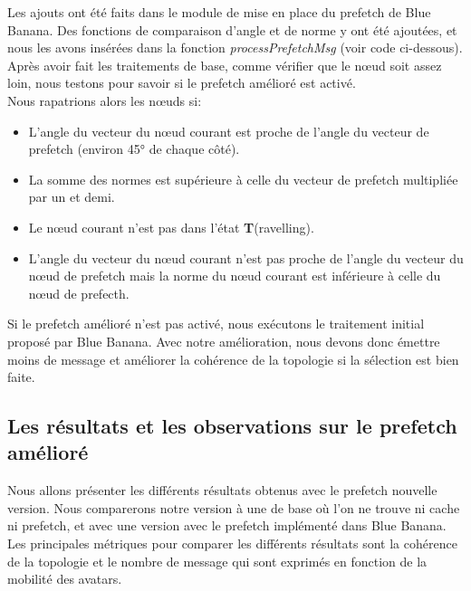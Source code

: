 \par Les ajouts ont été faits dans le module de mise en place du prefetch de Blue Banana. Des fonctions de comparaison d'angle et de norme y ont été ajoutées, et nous les avons insérées dans la fonction \textit{processPrefetchMsg} (voir code ci-dessous). Après avoir fait les traitements de base, comme vérifier que le nœud soit assez loin, nous testons pour savoir si le prefetch amélioré est activé. 
\newline
\\ Nous rapatrions alors les nœuds si:
        \begin{itemize}
        \renewcommand{\labelitemi}{$\bullet$}
                \item L'angle du vecteur du nœud courant est proche de l'angle du vecteur de prefetch (environ 45° de chaque côté).
		\item La somme des normes est supérieure à celle du vecteur de prefetch multipliée par un et demi. 
                \item Le nœud courant n'est pas dans l'état \textbf{T}(ravelling).
		\item L'angle du vecteur du nœud courant n'est pas proche de l'angle du vecteur du nœud de prefetch mais la norme du nœud courant est inférieure à celle du nœud de prefecth. 
        \end{itemize}
Si le prefetch amélioré n'est pas activé, nous exécutons le traitement initial proposé par Blue Banana. Avec notre amélioration, nous devons donc émettre moins de message et améliorer la cohérence de la topologie si la sélection est bien faite. 

\lstset{numbers=left,basicstyle=\scriptsize, numberstyle=\tiny, stepnumber=5, numbersep=5pt}




\subsection{Les résultats et les observations sur le prefetch amélioré}

Nous allons présenter les différents résultats obtenus avec le prefetch nouvelle version. Nous comparerons notre version à une de base où l'on ne trouve ni cache ni prefetch, et avec une version avec le prefetch implémenté dans Blue Banana. Les principales métriques pour comparer les différents résultats sont la cohérence de la topologie et le nombre de message qui sont exprimés en fonction de la mobilité des avatars.


